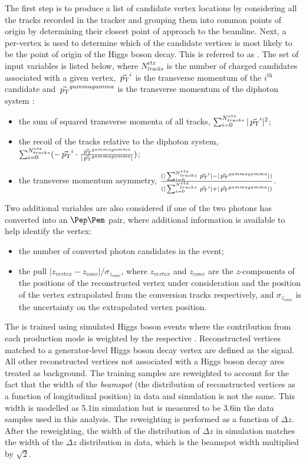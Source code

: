 The first step is to produce a list of candidate vertex locations by considering all the tracks recorded in the tracker and grouping them into common points of origin by determining their closest point of approach to the beamline. Next, a per-vertex \BDT is used to determine which of the candidate vertices is most likely to be the point of origin of the Higgs boson decay. This \BDT is referred to as \VtxIdBdt. The set of input variables is listed below, where $N_{tracks}^{vtx}$ is the number of charged \PF candidates associated with a given vertex, $\vec{\,p_\text{T}}^i$ is the transverse momentum of the $i^{\textrm{th}}$ candidate and $\vec{\,p_\text{T}}^{gammagamma}$ is the transverse momentum of the diphoton system :
\begin{itemize}
\item the sum of squared transverse momenta of all tracks, $\sum_{i=0}^{N_{tracks}^{vtx}} | \vec{\,p_\text{T}}^{i} |^2$;
\item the recoil of the tracks relative to the diphoton system, $\sum_{i=0}^{N_{tracks}^{vtx}} (- \vec{\,p_\text{T}}^i \cdot \frac{\vec{\,p_\text{T}}^{gammagamma}}{|\vec{\,p_\text{T}}^{gammagamma}| })$;
\item the transverse momentum asymmetry, $\frac{(|\sum_{i=0}^{N_{tracks}^{vtx}} \vec{\,p_\text{T}}^i| - |\vec{\,p_\text{T}}^{gammagamma}|)}{(|\sum_{i=0}^{N_{tracks}^{vtx}} \vec{\,p_\text{T}}^i| + |\vec{\,p_\text{T}}^{gammagamma}|)}$.
\end{itemize}

Two additional variables are also considered if one of the two photons has converted into an $\Pep\Pem$ pair, where additional information is available to help identify the vertex:
\begin{itemize}
\item the number of converted photon candidates in the event;
\item the pull $|z_{vertex} - z_{conv}|/\sigma_{z_{conv}} $, where $z_{vertex}$ and $ z_{conv}$ are the $z$-components of the positions of the reconstructed vertex under consideration and the position of the vertex extrapolated from the conversion tracks respectively, and $\sigma_{z_{conv}} $ is the uncertainty on the extrapolated vertex position.
\end{itemize}

The \VtxIdBdt is trained using simulated Higgs boson events %
where the contribution from each production mode is weighted by the respective \SM \crosssection. Reconstructed vertices matched to a generator-level Higgs boson decay vertex are defined as the signal. All other reconstructed vertices not associated with a Higgs boson decay ares treated as background. The training samples are reweighted to account for the fact that the width of the \emph{beamspot} (the distribution of reconstructed vertices as a function of longitudinal position) in data and simulation is not the same. This width is modelled as 5.1\cm in simulation but is measured to be 3.6\cm in the data samples used in this analysis. The reweighting is performed as a function of $\Delta z$. After the reweighting, the width of the distribution of $\Delta z$ in simulation matches the width of the $\Delta z$ distribution in data, which is the beamspot width multiplied by $\sqrt{2}$.

